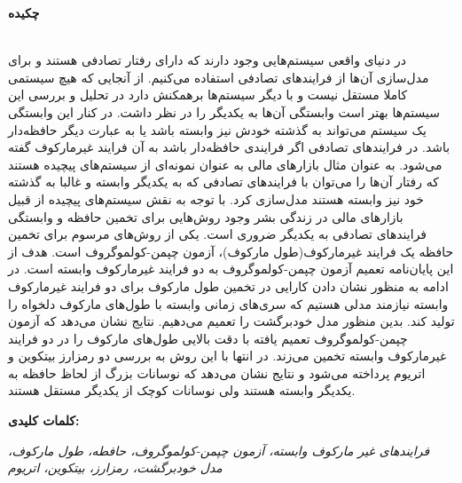 \thispagestyle{empty}
\noindent
\centerline{\textbf{\large{چکیده}}} \\
در دنیای واقعی سیستم‌هایی وجود دارند که دارای رفتار تصادفی هستند و برای مدل‌سازی آن‌ها از فرایندهای تصادفی استفاده می‌کنیم.
از آنجایی که هیچ سیستمی کاملا مستقل نیست و با دیگر سیستم‌ها برهمکنش دارد در تحلیل و بررسی این سیستم‌ها بهتر است وابستگی 
آن‌ها به یکدیگر را در نظر داشت. در کنار این وابستگی یک سیستم می‌تواند به گذشته خودش نیز وابسته باشد 
یا به عبارت دیگر حافظه‌دار باشد. در فرایندهای تصادفی اگر فرایندی حافظه‌دار باشد به ‌آن فرایند غیرمارکوف گفته می‌شود.
به عنوان مثال بازارهای مالی به عنوان نمونه‌ای از سیستم‌های پیچیده هستند که رفتار آن‌ها را می‌توان با فرایندهای تصادفی 
که به یکدیگر وابسته و غالبا به گذشته خود نیز وابسته هستند مدل‌سازی کرد.
با توجه به نقش سیستم‌های پیچیده از قبیل بازارهای مالی در زندگی بشر وجود روش‌هایی برای تخمین حافظه 
و وابستگی فرایندهای تصادفی به یکدیگر ضروری است.
یکی از روش‌های مرسوم برای تخمین حافظه یک فرایند غیرمارکوف(طول مارکوف)، آزمون چپمن-کولموگروف است.
هدف از این پایان‌نامه تعمیم آزمون چپمن-کولموگروف به دو فرایند غیرمارکوف وابسته است.
در ادامه به منظور نشان دادن کارایی در تخمین طول مارکوف برای دو فرایند غیرمارکوف وابسته نیازمند مدلی هستیم که 
سری‌های زمانی وابسته با طول‌های مارکوف دلخواه را تولید کند. بدین منظور مدل خودبرگشت را تعمیم می‌دهیم. 
نتایج نشان می‌دهد که آزمون چپمن-کولموگروف تعمیم یافته با دقت بالایی طول‌های مارکوف را در دو فرایند 
غیرمارکوف وابسته تخمین می‌زند.
در انتها با این روش به بررسی دو رمزارز بیتکوین و اتریوم پرداخته می‌شود و نتایج نشان می‌دهد که نوسانات بزرگ از لحاظ حافظه 
به یکدیگر وابسته هستند ولی نوسانات کوچک از یکدیگر مستقل هستند.

\textbf{کلمات کلیدی:}

\textit{فرایند‌های غیر مارکوف وابسته، آزمون چپمن-کولموگروف، حافطه، طول مارکوف، مدل خودبرگشت، رمزارز، بیتکوین، اتریوم}